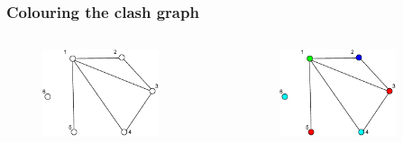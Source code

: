 \documentclass{beamer}
\begin{document}
\begin{frame}
\frametitle{Colouring the clash graph}
\begin{columns}[c]
\begin{figure}[!ht]
  \centering
  \includegraphics[width=0.8\textwidth]{graph.pdf}
\end{figure}
\begin{figure}[!ht]
  \centering
  \includegraphics[width=0.8\textwidth]{colouredGraph.pdf}
\end{figure}
\end{columns}
\end{frame}
\end{document}

